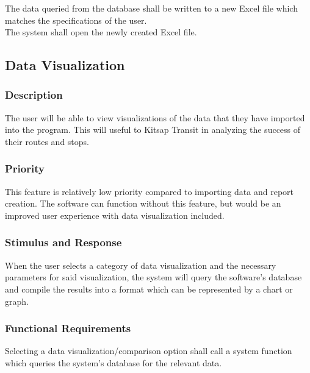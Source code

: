 The data queried from the database shall be written to a new Excel file which matches the specifications of the user.\\

The system shall open the newly created Excel file.

\subsection{Data Visualization}
\subsubsection{Description}
The user will be able to view visualizations of the data that they have imported into the program. This will useful to Kitsap Transit in analyzing the success of their routes and stops. 

\subsubsection{Priority}
This feature is relatively low priority compared to importing data and report creation. The software can function without this feature, but would be an improved user experience with data visualization included.

\subsubsection{Stimulus and Response}
When the user selects a category of data visualization and the necessary parameters for said visualization, the system will query the software's database and compile the results into a format which can be represented by a chart or graph.

\subsubsection{Functional Requirements}
Selecting a data visualization/comparison option shall call a system function which queries the system's database for the relevant data.\\

